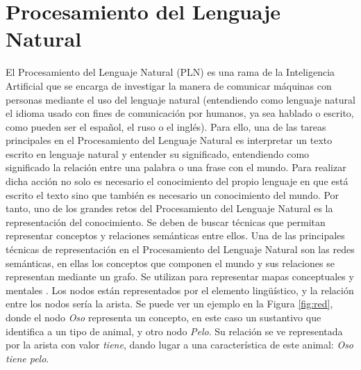 \section{Procesamiento del Lenguaje Natural}
\label{cap:sec:lenguajenatural}
El Procesamiento del Lenguaje Natural (PLN) es una rama de la Inteligencia Artificial que se encarga de investigar la manera de comunicar máquinas con personas mediante el uso del lenguaje natural (entendiendo como lenguaje natural el idioma usado con fines de comunicación por humanos, ya sea hablado o escrito, como pueden ser el español, el ruso o el inglés). 
Para ello, una de las tareas principales en el Procesamiento del Lenguaje Natural es interpretar un texto escrito en lenguaje natural y entender su significado, entendiendo como significado la relación entre una palabra o una frase con el mundo. Para realizar dicha acción no solo es necesario el conocimiento del propio lenguaje en que está escrito el texto sino que también es necesario un conocimiento del mundo. Por tanto, uno de los grandes retos del Procesamiento del Lenguaje Natural es la representación del conocimiento. Se deben de buscar técnicas que permitan representar conceptos y relaciones semánticas entre ellos. 
Una de las principales técnicas de representación en el Procesamiento del Lenguaje Natural son las redes semánticas, en ellas los conceptos que componen el mundo y sus relaciones se representan mediante un grafo. Se utilizan para representar mapas conceptuales y mentales \citep{redSemantica2018}.
Los nodos están representados por el elemento lingüístico, y la relación entre los nodos sería la arista. Se puede ver un ejemplo en la Figura \ref{fig:red}, donde el nodo \textit{Oso} representa un concepto, en este caso un sustantivo que identifica a un tipo de animal,  y otro nodo \textit{Pelo}. Su relación se ve representada por la arista con valor \textit{tiene}, dando lugar a una característica de este animal: \textit{Oso tiene pelo}.
 
